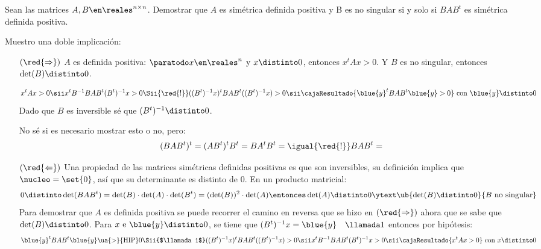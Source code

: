 \begin{enunciado}{\ejercicio}
  Sean las matrices $A, B \en \reales^{n \times n}$. Demostrar que $A$ es simétrica definida positiva y B
  es no singular si y solo si $BAB^t$ es simétrica definida positiva.
\end{enunciado}
Muestro una doble implicación:
\begin{itemize}
  \item[$(\red{\Rightarrow})$]
        $A$ es definida positiva:
        $\paratodo x \en \reales^n$ y  $x \distinto 0$, entonces $x^t A x > 0 $. Y $B$ es no singular, entonces $\det(B) \distinto 0$.

        $$
          x^t A x > 0
          \sii
          x^tB^{-1}B A B^t(B^t)^{-1} x > 0
          \Sii{\red{!}}
          ((B^t)^{-1}x)^tB A B^t ((B^t)^{-1} x) > 0
          \sii
          \cajaResultado{
            \blue{y}^tB A B^t \blue{y} > 0
          }
          \text{ con } \blue{y} \distinto 0
        $$
        Dado que $B$ es inversible sé que $(B^t)^{-1} \distinto 0$.

        No sé si es necesario mostrar esto o no, pero:
        $$
          (BAB^t)^t =
          (AB^t)^tB^t
          =
          BA^tB^t =
          \igual{\red{!}}
          BAB^t =
        $$

  \item[$(\red{\Leftarrow})$]
        Una propiedad de las matrices simétricas definidas positivas es que son inversibles, su definición implica que $\nucleo = \set{0}$, así que su determinante es distinto de 0.
        En un producto matricial:
        $$
          0 \distinto \det(B A B^t) =
          \det(B) \cdot \det(A) \cdot \det(B^t) =
          (\det(B))^2 \cdot \det(A)
          \entonces
          \det(A) \distinto 0  \ytext \ub{\det(B) \distinto 0}{B \text{ no singular}}
        $$
        Para demostrar que $A$ es definida positiva se puede recorrer el camino en reversa que se hizo en $(\red{\Rightarrow})$ ahora
        que se sabe que $\det(B) \distinto 0$. Para $x \text{ e } \blue{y} \distinto 0$, se tiene que $(B^t)^{-1} x = \blue{y}\quad \llamada1$ entonces por hipótesis:
        $$
          \blue{y}^tB A B^t \blue{y} \ua{>}{\text{HIP}} 0
          \Sii{$\llamada1$}
          ((B^t)^{-1}x)^tB A B^t ((B^t)^{-1} x) > 0
          \sii
          x^t B^{-1}B A B^t(B^t)^{-1} x > 0
          \sii
          \cajaResultado{
            x^t A x > 0
          } \text{ con } x \distinto 0
        $$
\end{itemize}

\begin{aportes}
  \item {}
\end{aportes}
